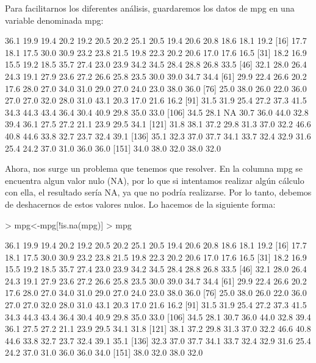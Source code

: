 \documentclass [a4paper] {article}
\begin{document}
Para facilitarnos los diferentes análisis, guardaremos los datos de mpg en una variable denominada mpg:

\begin{Schunk}
\begin{Soutput}
  [1] 36.1 19.9 19.4 20.2 19.2 20.5 20.2 25.1 20.5 19.4 20.6 20.8 18.6 18.1 19.2
 [16] 17.7 18.1 17.5 30.0 30.9 23.2 23.8 21.5 19.8 22.3 20.2 20.6 17.0 17.6 16.5
 [31] 18.2 16.9 15.5 19.2 18.5 35.7 27.4 23.0 23.9 34.2 34.5 28.4 28.8 26.8 33.5
 [46] 32.1 28.0 26.4 24.3 19.1 27.9 23.6 27.2 26.6 25.8 23.5 30.0 39.0 34.7 34.4
 [61] 29.9 22.4 26.6 20.2 17.6 28.0 27.0 34.0 31.0 29.0 27.0 24.0 23.0 38.0 36.0
 [76] 25.0 38.0 26.0 22.0 36.0 27.0 27.0 32.0 28.0 31.0 43.1 20.3 17.0 21.6 16.2
 [91] 31.5 31.9 25.4 27.2 37.3 41.5 34.3 44.3 43.4 36.4 30.4 40.9 29.8 35.0 33.0
[106] 34.5 28.1   NA 30.7 36.0 44.0 32.8 39.4 36.1 27.5 27.2 21.1 23.9 29.5 34.1
[121] 31.8 38.1 37.2 29.8 31.3 37.0 32.2 46.6 40.8 44.6 33.8 32.7 23.7 32.4 39.1
[136] 35.1 32.3 37.0 37.7 34.1 33.7 32.4 32.9 31.6 25.4 24.2 37.0 31.0 36.0 36.0
[151] 34.0 38.0 32.0 38.0 32.0
\end{Soutput}
\end{Schunk}

Ahora, nos surge un problema que tenemos que resolver. En la columna mpg se encuentra algun valor nulo (NA), por
lo que si intentamos realizar algún cálculo con ella, el resultado sería NA, ya que no podría realizarse. 
Por lo tanto, debemos de deshacernos de estos valores nulos. Lo hacemos de la siguiente forma:

\begin{Schunk}
\begin{Sinput}
> mpg<-mpg[!is.na(mpg)]
> mpg
\end{Sinput}
\begin{Soutput}
  [1] 36.1 19.9 19.4 20.2 19.2 20.5 20.2 25.1 20.5 19.4 20.6 20.8 18.6 18.1 19.2
 [16] 17.7 18.1 17.5 30.0 30.9 23.2 23.8 21.5 19.8 22.3 20.2 20.6 17.0 17.6 16.5
 [31] 18.2 16.9 15.5 19.2 18.5 35.7 27.4 23.0 23.9 34.2 34.5 28.4 28.8 26.8 33.5
 [46] 32.1 28.0 26.4 24.3 19.1 27.9 23.6 27.2 26.6 25.8 23.5 30.0 39.0 34.7 34.4
 [61] 29.9 22.4 26.6 20.2 17.6 28.0 27.0 34.0 31.0 29.0 27.0 24.0 23.0 38.0 36.0
 [76] 25.0 38.0 26.0 22.0 36.0 27.0 27.0 32.0 28.0 31.0 43.1 20.3 17.0 21.6 16.2
 [91] 31.5 31.9 25.4 27.2 37.3 41.5 34.3 44.3 43.4 36.4 30.4 40.9 29.8 35.0 33.0
[106] 34.5 28.1 30.7 36.0 44.0 32.8 39.4 36.1 27.5 27.2 21.1 23.9 29.5 34.1 31.8
[121] 38.1 37.2 29.8 31.3 37.0 32.2 46.6 40.8 44.6 33.8 32.7 23.7 32.4 39.1 35.1
[136] 32.3 37.0 37.7 34.1 33.7 32.4 32.9 31.6 25.4 24.2 37.0 31.0 36.0 36.0 34.0
[151] 38.0 32.0 38.0 32.0
\end{Soutput}
\end{Schunk}
\end{document}
